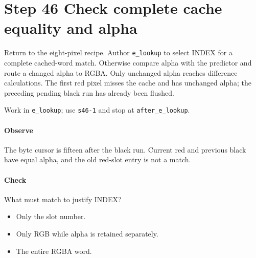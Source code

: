 \section{Step 46 Check complete cache equality and alpha}\label{qoi-s46}
Return to the eight-pixel recipe. Author \texttt{e\_lookup} to select INDEX for a complete cached-word match. Otherwise compare alpha with the predictor and route a changed alpha to RGBA. Only unchanged alpha reaches difference calculations. The first red pixel misses the cache and has unchanged alpha; the preceding pending black run has already been flushed.

Work in \texttt{e\_lookup}; use \texttt{s46-1} and stop at \texttt{after\_e\_lookup}.

\paragraph{Observe} The byte cursor is fifteen after the black run. Current red and previous black have equal alpha, and the old red-slot entry is not a match.

\paragraph{Check} What must match to justify INDEX?
\begin{itemize}
\item[A.] Only the slot number.
\item[B.] Only RGB while alpha is retained separately.
\item[C.] The entire RGBA word.
\end{itemize}
